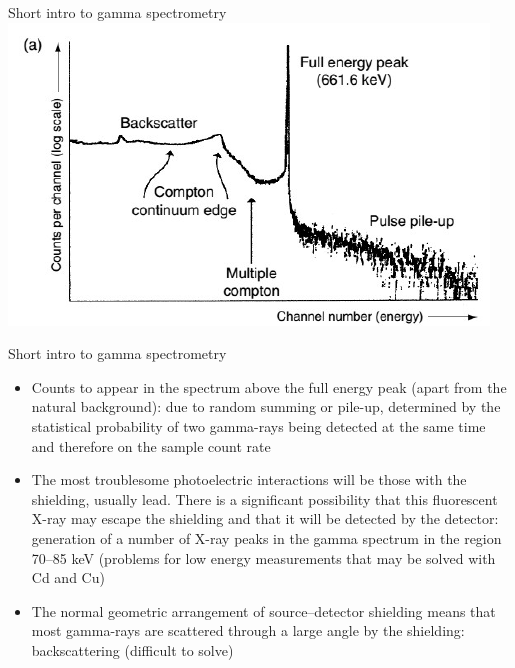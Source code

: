 \begin{frame}{Short intro to gamma spectrometry}
\centering
\includegraphics[scale=0.6]{figures/gammaspecexample.png}
\end{frame}

\begin{frame}{Short intro to gamma spectrometry}

\begin{exampleblock}{}

{\small
\begin{itemize}
\item Counts to appear in the spectrum above the full energy peak (apart from the natural background): due to random summing or pile-up, determined by the statistical probability of two gamma-rays being detected at the same time and therefore on the sample count rate 
\item The most troublesome photoelectric interactions will be those with the shielding, usually lead. There is a significant possibility that this fluorescent X-ray may escape the shielding and that it will be detected by the detector: generation of a number of X-ray peaks in the gamma spectrum in the region 70–85 keV (problems for low energy measurements that may be solved with Cd and Cu) 
\item The normal geometric arrangement of source–detector shielding means that most gamma-rays are scattered through a large angle by the shielding: backscattering (difficult to solve)
\end{itemize}
}
\end{exampleblock}

\end{frame}

